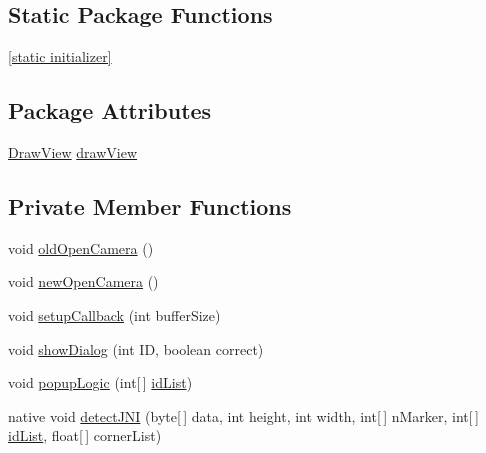 \subsection*{Static Package Functions}
\begin{DoxyCompactItemize}
\item 
\hyperlink{classsdem_1_1unimore_1_1com_1_1sdemapp_1_1_camera_view_a280b642876ffeeaf862ef26b35a59ce4}{\mbox{[}static initializer\mbox{]}}
\end{DoxyCompactItemize}
\subsection*{Package Attributes}
\begin{DoxyCompactItemize}
\item 
\hyperlink{classsdem_1_1unimore_1_1com_1_1sdemapp_1_1_draw_view}{Draw\+View} \hyperlink{classsdem_1_1unimore_1_1com_1_1sdemapp_1_1_camera_view_a27e349c15ba4f303127dbce08aed7c4f}{draw\+View}
\end{DoxyCompactItemize}
\subsection*{Private Member Functions}
\begin{DoxyCompactItemize}
\item 
void \hyperlink{classsdem_1_1unimore_1_1com_1_1sdemapp_1_1_camera_view_ac02db324e42c2267824d3bd3ca420fcf}{old\+Open\+Camera} ()
\item 
void \hyperlink{classsdem_1_1unimore_1_1com_1_1sdemapp_1_1_camera_view_a9d800698f11dca3e4cbeb756c82719c3}{new\+Open\+Camera} ()
\item 
void \hyperlink{classsdem_1_1unimore_1_1com_1_1sdemapp_1_1_camera_view_a64ac2459a0115aacee85726bc4d83ed9}{setup\+Callback} (int buffer\+Size)
\item 
void \hyperlink{classsdem_1_1unimore_1_1com_1_1sdemapp_1_1_camera_view_aee169b8cbcf35388039cf57279b394ca}{show\+Dialog} (int I\+D, boolean correct)
\item 
void \hyperlink{classsdem_1_1unimore_1_1com_1_1sdemapp_1_1_camera_view_ad89b9876843e04f227bb2ec5eccdb6db}{popup\+Logic} (int\mbox{[}$\,$\mbox{]} \hyperlink{classsdem_1_1unimore_1_1com_1_1sdemapp_1_1_camera_view_a93a3fb2662449c848c4e853aa41d603c}{id\+List})
\item 
native void \hyperlink{classsdem_1_1unimore_1_1com_1_1sdemapp_1_1_camera_view_a56fbf943f868becfab4e5578987f2bdb}{detect\+J\+N\+I} (byte\mbox{[}$\,$\mbox{]} data, int height, int width, int\mbox{[}$\,$\mbox{]} n\+Marker, int\mbox{[}$\,$\mbox{]} \hyperlink{classsdem_1_1unimore_1_1com_1_1sdemapp_1_1_camera_view_a93a3fb2662449c848c4e853aa41d603c}{id\+List}, float\mbox{[}$\,$\mbox{]} corner\+List)
\end{DoxyCompactItemize}
